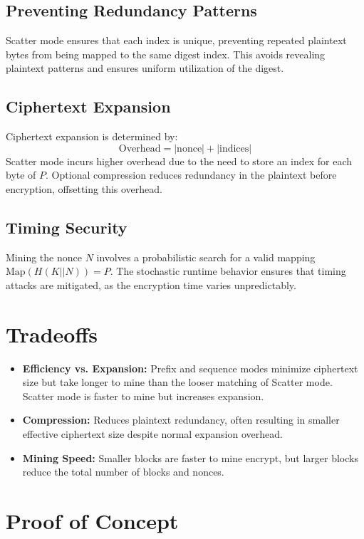 \documentclass[11pt,a4paper]{article}
\begin{document}
\subsection*{Preventing Redundancy Patterns}

Scatter mode ensures that each index is unique, preventing repeated plaintext bytes from being mapped to the same digest index. This avoids revealing plaintext patterns and ensures uniform utilization of the digest.

\subsection*{Ciphertext Expansion}

Ciphertext expansion is determined by:
\[
\text{Overhead} = |\text{nonce}| + |\text{indices}|
\]
Scatter mode incurs higher overhead due to the need to store an index for each byte of \( P \). Optional compression reduces redundancy in the plaintext before encryption, offsetting this overhead.

\subsection*{Timing Security}

Mining the nonce \( N \) involves a probabilistic search for a valid mapping \( \text{Map}(H(K || N)) = P \). The stochastic runtime behavior ensures that timing attacks are mitigated, as the encryption time varies unpredictably.

\section*{Tradeoffs}

\begin{itemize}
  \item \textbf{Efficiency vs. Expansion:} Prefix and sequence modes minimize ciphertext size but take longer to mine than the looser matching of Scatter mode. Scatter mode is faster to mine but increases expansion.
  \item \textbf{Compression:} Reduces plaintext redundancy, often resulting in smaller effective ciphertext size despite normal expansion overhead.
  \item \textbf{Mining Speed:} Smaller blocks are faster to mine encrypt, but larger blocks reduce the total number of blocks and nonces.
\end{itemize}

\section*{Proof of Concept}
\end{document}
